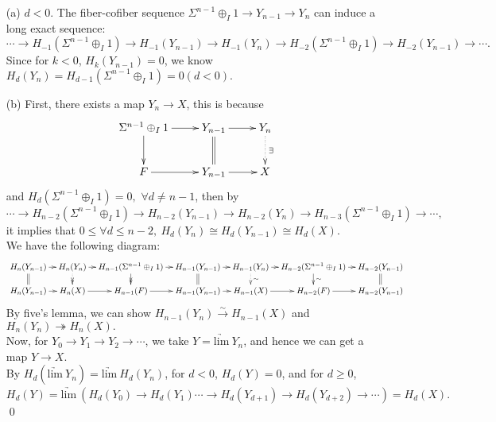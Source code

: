 \documentclass[UTF8,12,a4paper]{ctexart}
\theoremstyle{definition}
\begin{document}
\begin{itemize}
	\item [(a)] $d<0$.
	The fiber-cofiber sequence $\Sigma^{n-1}\oplus_I 1\to Y_{n-1}\to Y_n$ can induce a long exact sequence:
	$$
	\cdots\rightarrow H_{-1}(\Sigma^{n-1}\oplus_I 1)\rightarrow H_{-1}(Y_{n-1})\rightarrow H_{-1}(Y_{n})
	\rightarrow H_{-2}(\Sigma^{n-1}\oplus_I 1)\rightarrow H_{-2}(Y_{n-1})\rightarrow\cdots.
	$$
	Since for $k<0$, $H_k(Y_{n-1})=0$, we know $H_d(Y_n)=H_{d-1}(\Sigma^{n-1}\oplus_I 1)=0(d<0).$
	\item [(b)] First, there exists a map $Y_n\rightarrow X$, this is because
	\begin{equation*}
	\xymatrix
{
	\Sigma^{n-1}\oplus_I 1  \ar[r] \ar[d] & Y_{n-1}\ar@{=}[d] \ar[r] &Y_n\ar@{.>}[d]^{\exists}\\
	F\ar[r] & Y_{n-1}\ar[r] &X
}
	\end{equation*}
and $H_d(\Sigma^{n-1}\oplus_I 1)=0,$  $\forall  d\neq n-1$, then by
$$\cdots\rightarrow H_{n-2}(\Sigma^{n-1}\oplus_I 1)\rightarrow H_{n-2}(Y_{n-1})\rightarrow H_{n-2}(Y_{n})\rightarrow H_{n-3}(\Sigma^{n-1}\oplus_I 1)\rightarrow\cdots,$$
it implies that $0\leq \forall d\leq n-2,\ H_d(Y_n)\cong H_d(Y_{n-1})\cong H_d(X).$\\
We have the following diagram:
\begin{equation*}
\xymatrix@C=8pt@R=12pt
{
H_n(Y_{n-1})\ar[r] \ar@{=}[d]&H_n(Y_{n})\ar[r]\ar@{.>>}[d]&H_{n-1}(\Sigma^{n-1}\oplus_I 1)\ar[r]\ar@{->>}[d] &H_{n-1}(Y_{n-1})\ar[r]\ar@{=}[d] &H_{n-1}(Y_{n})\ar[r]\ar@{.>}[d]^{\sim} &H_{n-2}(\Sigma^{n-1}\oplus_I 1)\ar[r] \ar[d]^{\sim} &H_{n-2}(Y_{n-1})\ar@{=}[d]\\
H_n(Y_{n-1})\ar[r]&H_n(X)\ar[r]&H_{n-1}(F)\ar[r] &H_{n-1}(Y_{n-1})\ar[r] &H_{n-1}(X)\ar[r] &H_{n-2}(F)\ar[r]  &H_{n-2}(Y_{n-1})
}
\end{equation*}
By five's lemma, we can show $H_{n-1}(Y_n)\stackrel{\sim}{\rightarrow} H_{n-1}(X)$ and $H_n(Y_n)\twoheadrightarrow H_n(X).$\\
Now, for $Y_0\rightarrow Y_1\rightarrow Y_2\rightarrow\cdots$, we take $Y=\underrightarrow{\text{lim}}\ Y_n$, and hence we can get a map $Y\rightarrow X$.\\
By $H_d(\underrightarrow{\text{lim}}\ Y_n)=\underrightarrow{\text{lim}}\ H_d(Y_n)$, for $d<0$, $H_d(Y)=0$, and for $d\geq 0$,
$$
H_d(Y)=\underrightarrow{\text{lim}}\ (H_d(Y_0)\rightarrow H_d(Y_1)\cdots\rightarrow H_d(Y_{d+1})\rightarrow H_d(Y_{d+2})\rightarrow\cdots)=H_d(X).
$$
\qed
\end{itemize}
\end{document}
